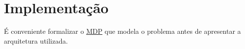


\chapter{Implementação}
\label{cap:implementacao}


É conveniente formalizar o \hyperref[sec:mdp]{MDP} que modela o problema antes de apresentar a arquitetura utilizada.

